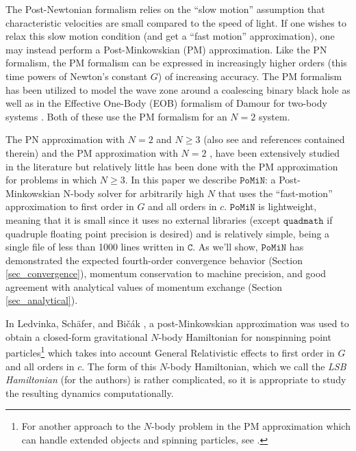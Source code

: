 \documentclass[aps,onecolumn,notitlepage,eqsecnum,nofootinbib,floatfix,superscriptaddress]{revtex4-1}
\newcommand{\codename}{\mathtt{PoMiN}}
\begin{document}
The Post-Newtonian formalism relies on the ``slow motion'' assumption that characteristic velocities are small compared to the speed of light.  If one wishes to relax this slow motion condition (and get a ``fast motion'' approximation), one may instead perform a Post-Minkowskian (PM) approximation. Like the PN formalism, the PM formalism can be expressed in increasingly higher orders (this time powers of Newton’s constant $G$) of increasing accuracy. The PM formalism has been utilized to model the wave zone around a coalescing binary black hole \cite{Blanchet} as well as in the Effective One-Body (EOB) formalism of Damour for two-body systems \cite{EOB}.  Both of these use the PM formalism for an $N=2$ system.

The PN approximation with $N=2$ and $N \geq 3$ 
\cite{Futamase2007,Itoh2009,Schafer1987,LoustoNakano2008,Kupi2006,Bremetal2013,Aarseth2007,Will2013,Will2014}
(also see \cite{Blanchet} and references contained therein)
and the PM approximation with $N=2$ 
\cite{Blanchet,EOB,Westpfahl1979,Portilla1979,Portilla1980,Beletal1981,Westpfahl1985,Westpfahletal1987}, 
have been extensively studied in the literature but relatively little has been done with the PM approximation for problems in which $N \geq 3$.  In this paper we describe $\codename$: a Post-Minkowskian N-body solver for arbitrarily high $N$ that uses the ``fast-motion'' approximation to first order in $G$ and all orders in $c$.  $\codename$ is lightweight, meaning that it is small since it uses no external libraries (except $\mathtt{quadmath}$ if quadruple floating point precision is desired) and is relatively simple, being a single file of less than 1000 lines written in $\mathtt{C}$.  As we'll show, $\codename$ has demonstrated the expected fourth-order convergence behavior (Section \ref{sec_convergence}), momentum conservation to machine precision, and good agreement with analytical values of momentum exchange (Section \ref{sec_analytical}).

In Ledvinka, Sch{\"a}fer, and Bi{\v c}{\'a}k \cite{PM}, a post-Minkowskian approximation was used to obtain a closed-form gravitational $N$-body Hamiltonian for nonspinning point particles\footnote{For another approach to the $N$-body problem in the PM approximation which can handle extended objects and spinning particles, see \cite{ZschockeSoffel}.} which takes into account General Relativistic effects to first order in $G$ and all orders in $c$. The form of this $N$-body Hamiltonian, which we call the \textit{LSB Hamiltonian} (for the authors) is rather complicated, so it is appropriate to study the resulting dynamics computationally. 
\end{document}
